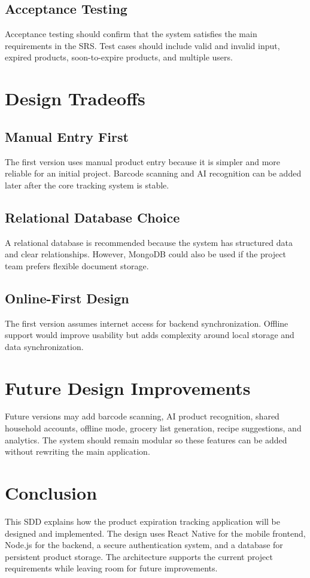\documentclass[12pt]{article}
\begin{document}
\subsection{Acceptance Testing}
Acceptance testing should confirm that the system satisfies the main requirements in the SRS. Test cases should include valid and invalid input, expired products, soon-to-expire products, and multiple users.

\section{Design Tradeoffs}

\subsection{Manual Entry First}
The first version uses manual product entry because it is simpler and more reliable for an initial project. Barcode scanning and AI recognition can be added later after the core tracking system is stable.

\subsection{Relational Database Choice}
A relational database is recommended because the system has structured data and clear relationships. However, MongoDB could also be used if the project team prefers flexible document storage.

\subsection{Online-First Design}
The first version assumes internet access for backend synchronization. Offline support would improve usability but adds complexity around local storage and data synchronization.

\section{Future Design Improvements}
Future versions may add barcode scanning, AI product recognition, shared household accounts, offline mode, grocery list generation, recipe suggestions, and analytics. The system should remain modular so these features can be added without rewriting the main application.

\section{Conclusion}
This SDD explains how the product expiration tracking application will be designed and implemented. The design uses React Native for the mobile frontend, Node.js for the backend, a secure authentication system, and a database for persistent product storage. The architecture supports the current project requirements while leaving room for future improvements.
\end{document}
